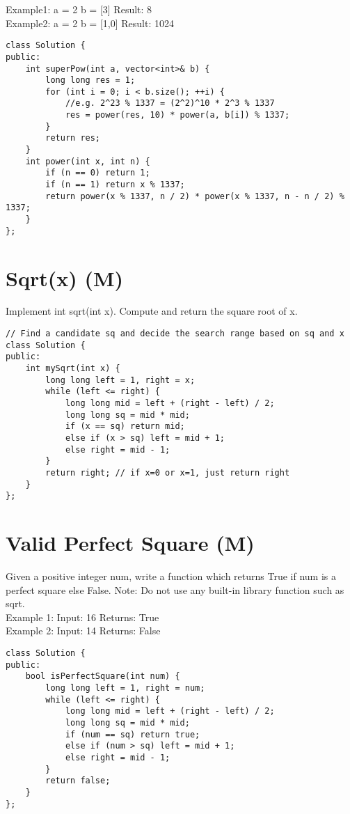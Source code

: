 Example1:
a = 2
b = [3]
Result: 8\\

Example2:
a = 2
b = [1,0]
Result: 1024\\

\begin{lstlisting}
class Solution {
public:
    int superPow(int a, vector<int>& b) {
        long long res = 1;
        for (int i = 0; i < b.size(); ++i) {
            //e.g. 2^23 % 1337 = (2^2)^10 * 2^3 % 1337
            res = power(res, 10) * power(a, b[i]) % 1337;
        }
        return res;
    }
    int power(int x, int n) {
        if (n == 0) return 1;
        if (n == 1) return x % 1337;
        return power(x % 1337, n / 2) * power(x % 1337, n - n / 2) % 1337;
    }
};
\end{lstlisting}


\section{Sqrt(x) (M)}
Implement int sqrt(int x). Compute and return the square root of x. \\

\begin{lstlisting}
// Find a candidate sq and decide the search range based on sq and x
class Solution {
public:
    int mySqrt(int x) {
        long long left = 1, right = x;
        while (left <= right) {
            long long mid = left + (right - left) / 2;
            long long sq = mid * mid; 
            if (x == sq) return mid;
            else if (x > sq) left = mid + 1;
            else right = mid - 1;
        }
        return right; // if x=0 or x=1, just return right
    }
};
\end{lstlisting}


\section{Valid Perfect Square (M)}
Given a positive integer num, write a function which returns True if num is a perfect square else False. Note: Do not use any built-in library function such as sqrt.\\

Example 1:
Input: 16
Returns: True\\

Example 2:
Input: 14
Returns: False\\

\begin{lstlisting}
class Solution {
public:
    bool isPerfectSquare(int num) {
        long long left = 1, right = num;
        while (left <= right) {
            long long mid = left + (right - left) / 2;
            long long sq = mid * mid; 
            if (num == sq) return true;
            else if (num > sq) left = mid + 1;
            else right = mid - 1;
        }
        return false;     
    }
};
\end{lstlisting}


